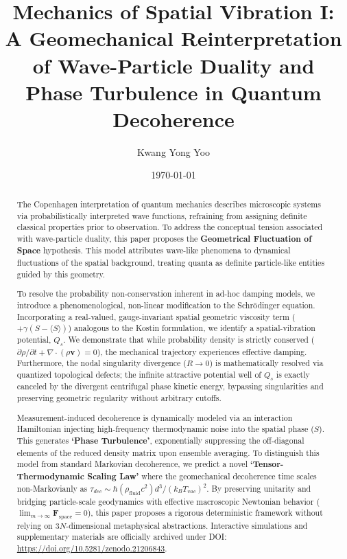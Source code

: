 \documentclass[reprint,amsmath,amssymb,aps,prd]{revtex4-2}
\begin{document}

\title{Mechanics of Spatial Vibration I: A Geomechanical Reinterpretation of Wave-Particle Duality and Phase Turbulence in Quantum Decoherence}

\author{Kwang Yong Yoo}
\date{\today}

\begin{abstract}
The Copenhagen interpretation of quantum mechanics describes microscopic systems via probabilistically interpreted wave functions, refraining from assigning definite classical properties prior to observation. To address the conceptual tension associated with wave-particle duality, this paper proposes the \textbf{Geometrical Fluctuation of Space} hypothesis. This model attributes wave-like phenomena to dynamical fluctuations of the spatial background, treating quanta as definite particle-like entities guided by this geometry. 

To resolve the probability non-conservation inherent in ad-hoc damping models, we introduce a phenomenological, non-linear modification to the Schr\"{o}dinger equation. Incorporating a real-valued, gauge-invariant spatial geometric viscosity term ($+\gamma(S - \langle S \rangle)$) analogous to the Kostin formulation, we identify a spatial-vibration potential, $Q_s$. We demonstrate that while probability density is strictly conserved ($\partial\rho/\partial t + \nabla\cdot(\rho\mathbf{v})=0$), the mechanical trajectory experiences effective damping. Furthermore, the nodal singularity divergence ($R \to 0$) is mathematically resolved via quantized topological defects; the infinite attractive potential well of $Q_s$ is exactly canceled by the divergent centrifugal phase kinetic energy, bypassing singularities and preserving geometric regularity without arbitrary cutoffs.

Measurement-induced decoherence is dynamically modeled via an interaction Hamiltonian injecting high-frequency thermodynamic noise into the spatial phase ($S$). This generates \textbf{`Phase Turbulence'}, exponentially suppressing the off-diagonal elements of the reduced density matrix upon ensemble averaging. To distinguish this model from standard Markovian decoherence, we predict a novel \textbf{`Tensor-Thermodynamic Scaling Law'} where the geomechanical decoherence time scales non-Markovianly as $\tau_{dec} \sim \hbar (\rho_{\mathrm{fluid}} c^2) d^3 / (k_B T_{vac})^2$. By preserving unitarity and bridging particle-scale geodynamics with effective macroscopic Newtonian behavior ($\lim_{m \to \infty} \mathbf{F}_{\mathrm{space}} = 0$), this paper proposes a rigorous deterministic framework without relying on $3N$-dimensional metaphysical abstractions. Interactive simulations and supplementary materials are officially archived under DOI: \url{https://doi.org/10.5281/zenodo.21206843}.
\end{abstract}
\end{document}
